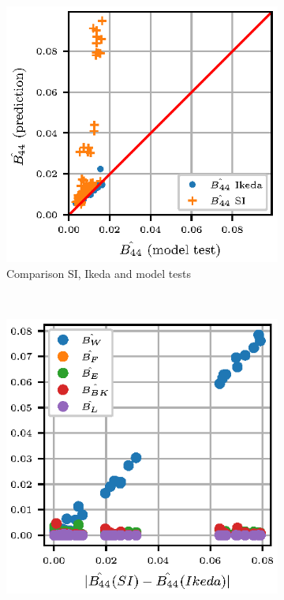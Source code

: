 \begin{figure}
    \centering
    \begin{subfigure}[b]{0.45\textwidth}
        \includegraphics[]{figures/si_ikeda_model.eps}
        \caption{Comparison SI, Ikeda and model tests}
        \label{fig:si_ikeda_model}
    \end{subfigure}
    ~ %
    \begin{subfigure}[b]{0.45\textwidth}
        \includegraphics[]{figures/component_residual.eps}

\end{subfigure}
\end{figure}
